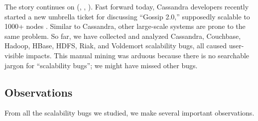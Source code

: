 %
%

The story continues on (, , \etc).  Fast forward today,
Cassandra developers recently started a new umbrella ticket for discussing
``Gossip 2.0,''  supposedly scalable to 1000+
nodes \cite{Gossip20, Gossip20Mail}.
Similar to Cassandra, other large-scale systems are prone to the same
problem.  So far, we have collected and analyzed \totCass Cassandra, \totCouch
Couchbase, \totHadoop Hadoop, \totHBase HBase, \totHDFS HDFS, \totRiak
Riak, and \totVold Voldemort scalability bugs, all caused user-visible
impacts.
%
This manual mining was arduous because there is no searchable jargon for
``scalability bugs''; we might have missed other bugs.
%

\subsection{Observations}
From all the scalability bugs we studied, we make several important observations.

